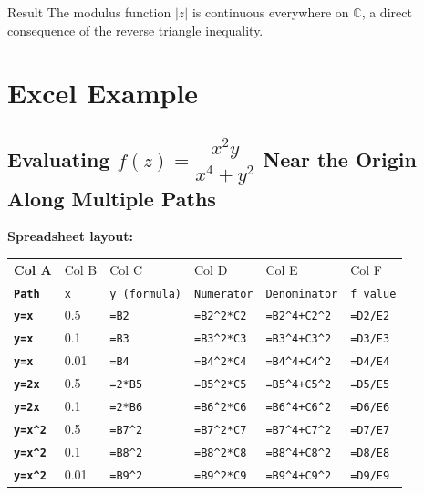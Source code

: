 \documentclass[12pt,a4paper]{article}
\begin{document}
\begin{learnbox}{Result}
The modulus function $|z|$ is continuous everywhere on $\mathbb{C}$,
a direct consequence of the reverse triangle inequality.
\end{learnbox}

\section{Excel Example}

\subsection*{Evaluating $f(z) = \dfrac{x^2y}{x^4+y^2}$ Near the Origin Along Multiple Paths}

\textbf{Spreadsheet layout:}

\begin{center}
\begin{tabular}{>{\bfseries}l l l l l l}
\toprule
Col A & Col B & Col C & Col D & Col E & Col F \\
\texttt{Path} & \texttt{x} & \texttt{y (formula)} & \texttt{Numerator} & \texttt{Denominator} & \texttt{f value} \\
\midrule
\texttt{y=x}    & 0.5 & \texttt{=B2}        & \texttt{=B2\^{}2*C2}    & \texttt{=B2\^{}4+C2\^{}2} & \texttt{=D2/E2} \\
\texttt{y=x}    & 0.1 & \texttt{=B3}        & \texttt{=B3\^{}2*C3}    & \texttt{=B3\^{}4+C3\^{}2} & \texttt{=D3/E3} \\
\texttt{y=x}    & 0.01 & \texttt{=B4}       & \texttt{=B4\^{}2*C4}    & \texttt{=B4\^{}4+C4\^{}2} & \texttt{=D4/E4} \\
\texttt{y=2x}   & 0.5 & \texttt{=2*B5}      & \texttt{=B5\^{}2*C5}    & \texttt{=B5\^{}4+C5\^{}2} & \texttt{=D5/E5} \\
\texttt{y=2x}   & 0.1 & \texttt{=2*B6}      & \texttt{=B6\^{}2*C6}    & \texttt{=B6\^{}4+C6\^{}2} & \texttt{=D6/E6} \\
\texttt{y=x\^{}2} & 0.5 & \texttt{=B7\^{}2} & \texttt{=B7\^{}2*C7}    & \texttt{=B7\^{}4+C7\^{}2} & \texttt{=D7/E7} \\
\texttt{y=x\^{}2} & 0.1 & \texttt{=B8\^{}2} & \texttt{=B8\^{}2*C8}    & \texttt{=B8\^{}4+C8\^{}2} & \texttt{=D8/E8} \\
\texttt{y=x\^{}2} & 0.01 & \texttt{=B9\^{}2}& \texttt{=B9\^{}2*C9}    & \texttt{=B9\^{}4+C9\^{}2} & \texttt{=D9/E9} \\
\bottomrule
\end{tabular}
\end{center}
\end{document}
